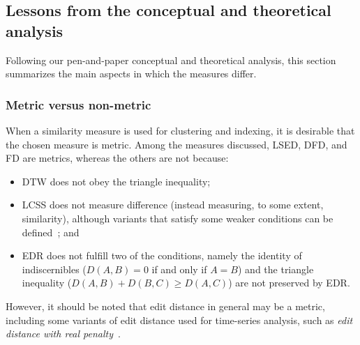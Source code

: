 \documentclass[10pt,letterpaper]{article}
\begin{document}
\subsection{Lessons from the conceptual and theoretical analysis}
Following our pen-and-paper conceptual and theoretical analysis, this section summarizes the main aspects in which the measures differ.




\subsubsection{Metric versus non-metric}

When a similarity measure is used for clustering and indexing, it is desirable that the chosen measure is metric. Among the measures discussed, LSED, DFD, and FD are metrics, whereas the others are not because: 
\begin{itemize}
\item DTW does not obey the triangle inequality;
\item LCSS does not measure difference (instead measuring, to some extent, similarity), although variants that satisfy some weaker conditions can be defined~\cite{VlachosGK02}; and
\item EDR does not fulfill two of the conditions, namely the identity of indiscernibles ($D(A, B) = 0$  if and only if   $A = B$)  and the triangle inequality ($D(A, B) + D(B, C) \geq D(A, C)$) are not preserved by EDR.
\end{itemize}
However, it should be noted that edit distance in general may be a metric, including some variants of edit distance used for time-series analysis, such as \emph{edit distance with real penalty}~\cite{NgC04}.
\end{document}
